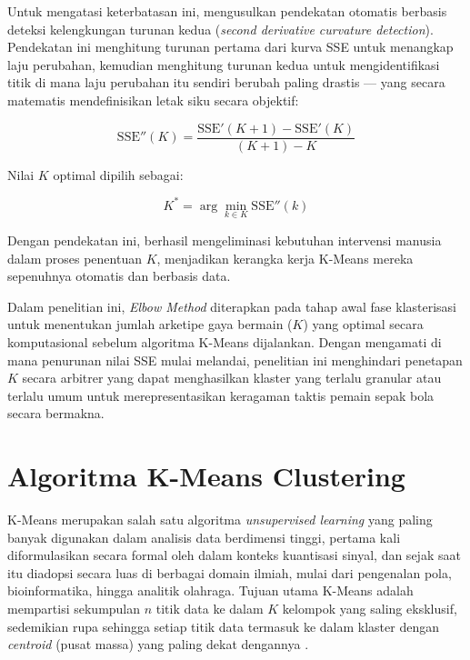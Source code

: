 Untuk mengatasi keterbatasan ini, \textcite{udhayasuriyan2025} mengusulkan pendekatan otomatis berbasis deteksi kelengkungan turunan kedua (\emph{second derivative curvature detection}). Pendekatan ini menghitung turunan pertama dari kurva SSE untuk menangkap laju perubahan, kemudian menghitung turunan kedua untuk mengidentifikasi titik di mana laju perubahan itu sendiri berubah paling drastis --- yang secara matematis mendefinisikan letak siku secara objektif:

\begin{equation}
  \mathrm{SSE}''(K) = \frac{\mathrm{SSE}'(K+1) - \mathrm{SSE}'(K)}{(K+1) - K}
  \label{eq:sse-2nd}
\end{equation}

Nilai $K$ optimal dipilih sebagai:

\begin{equation}
  K^{*} = \arg\min_{k \in K} \mathrm{SSE}''(k)
  \label{eq:k-optimal}
\end{equation}

Dengan pendekatan ini, \textcite{udhayasuriyan2025} berhasil mengeliminasi kebutuhan intervensi manusia dalam proses penentuan $K$, menjadikan kerangka kerja K-Means mereka sepenuhnya otomatis dan berbasis data.

Dalam penelitian ini, \emph{Elbow Method} diterapkan pada tahap awal fase klasterisasi untuk menentukan jumlah arketipe gaya bermain ($K$) yang optimal secara komputasional sebelum algoritma K-Means dijalankan. Dengan mengamati di mana penurunan nilai SSE mulai melandai, penelitian ini menghindari penetapan $K$ secara arbitrer yang dapat menghasilkan klaster yang terlalu granular atau terlalu umum untuk merepresentasikan keragaman taktis pemain sepak bola secara bermakna.

\section{Algoritma K-Means Clustering}
\label{sec:kmeans}

K-Means merupakan salah satu algoritma \emph{unsupervised learning} yang paling banyak digunakan dalam analisis data berdimensi tinggi, pertama kali diformulasikan secara formal oleh \textcite{lloyd1982} dalam konteks kuantisasi sinyal, dan sejak saat itu diadopsi secara luas di berbagai domain ilmiah, mulai dari pengenalan pola, bioinformatika, hingga analitik olahraga. Tujuan utama K-Means adalah mempartisi sekumpulan $n$ titik data ke dalam $K$ kelompok yang saling eksklusif, sedemikian rupa sehingga setiap titik data termasuk ke dalam klaster dengan \emph{centroid} (pusat massa) yang paling dekat dengannya \parencite{jain2010}.

